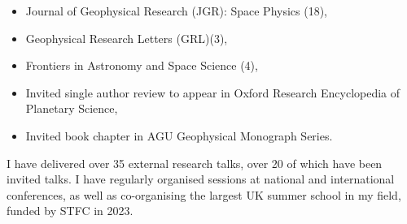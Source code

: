 \documentclass[11pt,a4paper]{article} %
\begin{document}
\begin{itemize}
	\item Journal of Geophysical Research (JGR): Space Physics (18),
		\vspace{-0.25cm}
	\item Geophysical Research Letters (GRL)(3),
		\vspace{-0.25cm}
	\item Frontiers in Astronomy and Space Science (4),   
		\vspace{-0.25cm}
	\item Invited single author review to appear in Oxford Research Encyclopedia of Planetary Science,
		\vspace{-0.25cm}
	\item Invited book chapter in AGU Geophysical Monograph Series.
\end{itemize}

\vspace{0.1cm} 
\noindent I have delivered over 35 external research talks, over 20 of which have been invited talks. I have regularly organised sessions at national and international conferences, as well as co-organising the largest UK summer school in my field, funded by STFC in 2023.




\spacedhrule{0.9em}{-0.4em} %

\end{document}
